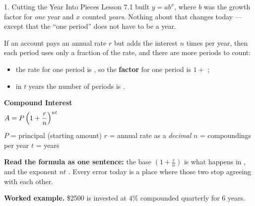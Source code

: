 \documentclass[10pt]{article}
\newcommand{\TallMath}[1]{$\displaystyle #1\rule[-1.4em]{0pt}{3.2em}$}
\begin{document}
\boxguard
\begin{notesbox}{1. Cutting the Year Into Pieces}
Lesson 7.1 built $y=ab^{x}$, where $b$ was the growth factor for \emph{one} year and $x$ counted
\emph{years}. Nothing about that changes today --- except that the ``one period'' does not have to be a
year.

\vspace{4pt}
If an account pays an annual rate $r$ but adds the interest $n$ times per year, then each period uses
only a fraction of the rate, and there are more periods to count:

\vspace{2pt}
\begin{itemize}[leftmargin=1.4em, itemsep=2pt]
  \item the rate for one period is , so the \textbf{factor} for one period is $1+$ ;
  \item in $t$ years the number of periods is .
\end{itemize}

\vspace{4pt}
\begin{center}
\begin{tcolorbox}[colback=goldbg, colframe=goldacc, boxrule=0.8pt, arc=1.5mm, width=0.92\linewidth,
    left=3mm, right=3mm, top=2mm, bottom=2mm]
\centering
\textbf{Compound Interest} \\[3pt]
\TallMath{A = P\left(1+\frac{r}{n}\right)^{nt}}
\\[1pt]
{\small $P$ = principal (starting amount) \quad $r$ = annual rate as a \emph{decimal} \quad
$n$ = compoundings per year \quad $t$ = years}
\end{tcolorbox}
\end{center}

\vspace{2pt}
\textbf{Read the formula as one sentence:} the base $\left(1+\frac{r}{n}\right)$ is what happens in
, and the exponent $nt$ . Every error today is a place where those two stop
agreeing with each other.

\vspace{5pt}
\textbf{Worked example.} \$2500 is invested at $4\%$ compounded quarterly for $6$ years.


\end{notesbox}
\end{document}
